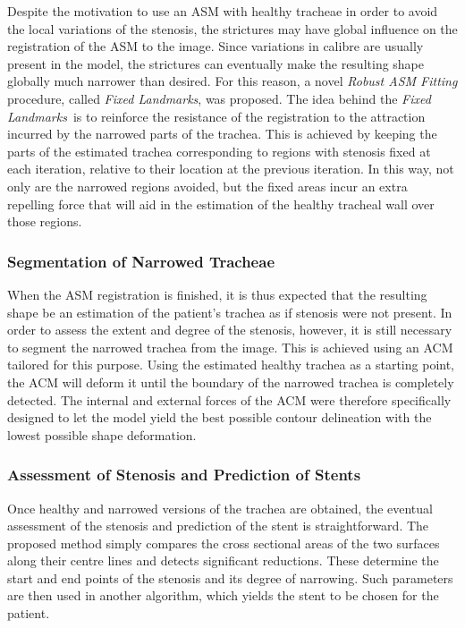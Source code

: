 \documentclass[a4paper]{article}
\newcommand{\fixedland}{{\it Fixed Landmarks}}
\begin{document}
Despite the motivation to use an ASM with healthy tracheae in order to avoid the local variations of the stenosis, the strictures may have global influence on the registration of the ASM to the image. Since variations in calibre are usually present in the model, the strictures can eventually make the resulting shape globally much narrower than desired. For this reason, a novel {\em Robust ASM Fitting} procedure, called \fixedland, was proposed. The idea behind the \fixedland\ is to reinforce the resistance of the registration to the attraction incurred by the narrowed parts of the trachea. This is achieved by keeping the parts of the estimated trachea corresponding to regions with stenosis fixed at each iteration, relative to their location at the previous iteration. In this way, not only are the narrowed regions avoided, but the fixed areas incur an extra repelling force that will aid in the estimation of the healthy tracheal wall over those regions.

\subsubsection{Segmentation of Narrowed Tracheae}

When the ASM registration is finished, it is thus expected that the resulting shape be an estimation of the patient's trachea as if stenosis were not present. In order to assess the extent and degree of the stenosis, however, it is still necessary to segment the narrowed trachea from the image. This is achieved using an ACM tailored for this purpose. Using the estimated healthy trachea as a starting point, the ACM will deform it until the boundary of the narrowed trachea is completely detected. The internal and external forces of the ACM were therefore specifically designed to let the model yield the best possible contour delineation with the lowest possible shape deformation.

\subsubsection{Assessment of Stenosis and Prediction of Stents}

Once healthy and narrowed versions of the trachea are obtained, the eventual assessment of the stenosis and prediction of the stent is straightforward. The proposed method simply compares the cross sectional areas of the two surfaces along their centre lines and detects significant reductions. These determine the start and end points of the stenosis and its degree of narrowing. Such parameters are then used in another algorithm, which yields the stent to be chosen for the patient.
\end{document}
